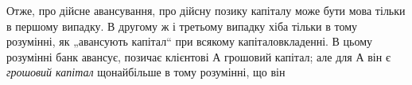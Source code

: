 Отже, про дійсне авансування, про дійсну позику капіталу
може бути мова тільки в першому випадку. В другому ж і третьому
випадку хіба тільки в тому розумінні, як „авансують капітал“
при всякому капіталовкладенні. В цьому розумінні банк
авансує, позичає клієнтові $А$ грошовий капітал; але для $А$ він
є \emph{грошовий капітал} щонайбільше в тому розумінні, що він
\parbreak{}  %

